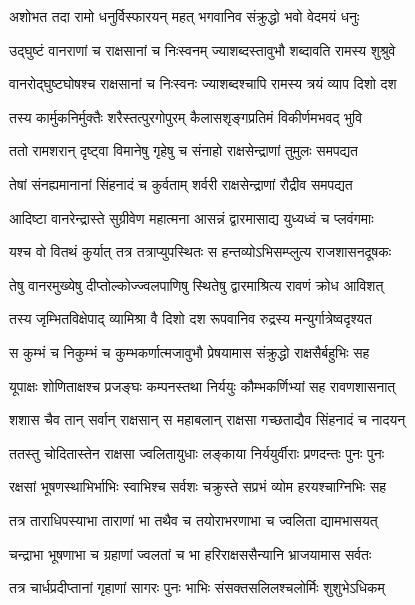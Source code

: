 \twolineshloka
{अशोभत तदा रामो धनुर्विस्फारयन् महत्}
{भगवानिव संक्रुद्धो भवो वेदमयं धनुः} %

\twolineshloka
{उद्घुष्टं वानराणां च राक्षसानां च निःस्वनम्}
{ज्याशब्दस्तावुभौ शब्दावति रामस्य शुश्रुवे} %

\twolineshloka
{वानरोद्घुष्टघोषश्च राक्षसानां च निःस्वनः}
{ज्याशब्दश्चापि रामस्य त्रयं व्याप दिशो दश} %

\twolineshloka
{तस्य कार्मुकनिर्मुक्तैः शरैस्तत्पुरगोपुरम्}
{कैलासशृङ्गप्रतिमं विकीर्णमभवद् भुवि} %

\twolineshloka
{ततो रामशरान् दृष्ट्वा विमानेषु गृहेषु च}
{संनाहो राक्षसेन्द्राणां तुमुलः समपद्यत} %

\twolineshloka
{तेषां संनह्यमानानां सिंहनादं च कुर्वताम्}
{शर्वरी राक्षसेन्द्राणां रौद्रीव समपद्यत} %

\twolineshloka
{आदिष्टा वानरेन्द्रास्ते सुग्रीवेण महात्मना}
{आसन्नं द्वारमासाद्य युध्यध्वं च प्लवंगमाः} %

\twolineshloka
{यश्च वो वितथं कुर्यात् तत्र तत्राप्युपस्थितः}
{स हन्तव्योऽभिसम्प्लुत्य राजशासनदूषकः} %

\twolineshloka
{तेषु वानरमुख्येषु दीप्तोल्कोज्ज्वलपाणिषु}
{स्थितेषु द्वारमाश्रित्य रावणं क्रोध आविशत्} %

\twolineshloka
{तस्य जृम्भितविक्षेपाद् व्यामिश्रा वै दिशो दश}
{रूपवानिव रुद्रस्य मन्युर्गात्रेष्वदृश्यत} %

\twolineshloka
{स कुम्भं च निकुम्भं च कुम्भकर्णात्मजावुभौ}
{प्रेषयामास संक्रुद्धो राक्षसैर्बहुभिः सह} %

\twolineshloka
{यूपाक्षः शोणिताक्षश्च प्रजङ्घः कम्पनस्तथा}
{निर्ययुः कौम्भकर्णिभ्यां सह रावणशासनात्} %

\twolineshloka
{शशास चैव तान् सर्वान् राक्षसान् स महाबलान्}
{राक्षसा गच्छताद्यैव सिंहनादं च नादयन्} %

\twolineshloka
{ततस्तु चोदितास्तेन राक्षसा ज्वलितायुधाः}
{लङ्काया निर्ययुर्वीराः प्रणदन्तः पुनः पुनः} %

\twolineshloka
{रक्षसां भूषणस्थाभिर्भाभिः स्वाभिश्च सर्वशः}
{चक्रुस्ते सप्रभं व्योम हरयश्चाग्निभिः सह} %

\twolineshloka
{तत्र ताराधिपस्याभा ताराणां भा तथैव च}
{तयोराभरणाभा च ज्वलिता द्यामभासयत्} %

\twolineshloka
{चन्द्राभा भूषणाभा च ग्रहाणां ज्वलतां च भा}
{हरिराक्षससैन्यानि भ्राजयामास सर्वतः} %

\twolineshloka
{तत्र चार्धप्रदीप्तानां गृहाणां सागरः पुनः}
{भाभिः संसक्तसलिलश्चलोर्मिः शुशुभेऽधिकम्} %

